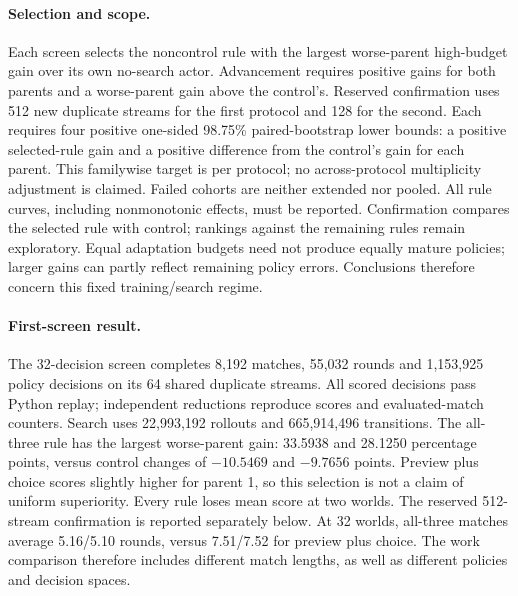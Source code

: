 \paragraph{Selection and scope.}
Each screen selects the noncontrol rule with the largest worse-parent
high-budget gain over its own no-search actor. Advancement requires positive
gains for both parents and a worse-parent gain above the control's. Reserved
confirmation uses 512 new duplicate streams for the first protocol and 128
for the second. Each requires four positive one-sided 98.75\% paired-bootstrap
lower bounds: a positive selected-rule gain and a positive difference from
the control's gain for each parent. This familywise target is per protocol;
no across-protocol multiplicity adjustment is claimed. Failed cohorts are
neither extended nor pooled. All rule curves, including nonmonotonic effects,
must be reported.
Confirmation compares the selected rule with control; rankings against
the remaining rules remain exploratory. Equal adaptation budgets need not
produce equally mature policies; larger gains can partly reflect remaining
policy errors. Conclusions therefore concern this fixed training/search regime.

\paragraph{First-screen result.}
The 32-decision screen completes 8,192 matches, 55,032 rounds and 1,153,925
policy decisions on its 64 shared duplicate streams. All scored decisions
pass Python replay; independent reductions reproduce scores and evaluated-match counters.
Search uses 22,993,192 rollouts and 665,914,496 transitions. The all-three
rule has the largest worse-parent gain: 33.5938 and 28.1250 percentage points,
versus control changes of $-10.5469$ and $-9.7656$ points. Preview plus choice
scores slightly higher for parent 1, so this selection is not a claim of
uniform superiority. Every rule loses mean score at two worlds. The reserved
512-stream confirmation is reported separately below.
At 32 worlds, all-three matches average 5.16/5.10 rounds, versus 7.51/7.52
for preview plus choice. The work comparison therefore includes different
match lengths, as well as different policies and decision spaces.

\begin{table}[ht]
\centering
\small

\caption{Complete first-screen curves. Entries are parent-0/parent-1 gains in
percentage points over the no-search actor. The nominal budgets are 2, 8 and
32 worlds per legal action; horizon is 32 decisions. Work is thousands of
physical search transitions per actual match, excluding policy training.
Nominal particle ratios do not match costs across games. All eight rules
share 64 duplicate streams; their 8,192 matches are not independent streams.}
\label{tab:public-stock-v2-curves}
\end{table}

